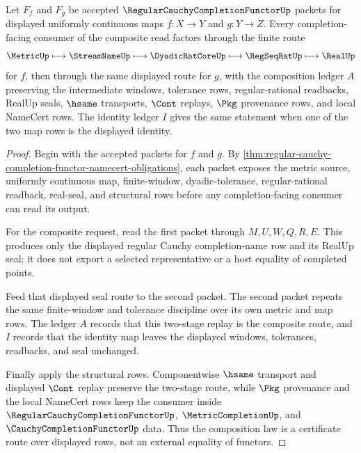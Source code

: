 \begin{theorem}
\label{thm:regular-cauchy-completion-functor-composition-law}
Let $F_f$ and $F_g$ be accepted $\RegularCauchyCompletionFunctorUp$ packets for displayed uniformly continuous maps $f \colon X \to Y$ and $g \colon Y \to Z$. Every completion-facing consumer of the composite read factors through the finite route
$$
\MetricUp \longmapsto \StreamNameUp \longmapsto \DyadicRatCoreUp \longmapsto \RegSeqRatUp \longmapsto \RealUp
$$
for $f$, then through the same displayed route for $g$, with the composition ledger $A$ preserving the intermediate windows, tolerance rows, regular-rational readbacks, RealUp seals, $\hsame$ transports, $\Cont$ replays, $\Pkg$ provenance rows, and local NameCert rows. The identity ledger $I$ gives the same statement when one of the two map rows is the displayed identity.
\end{theorem}
\begin{proof}
Begin with the accepted packets for $f$ and $g$. By \autoref{thm:regular-cauchy-completion-functor-namecert-obligations}, each packet exposes the metric source, uniformly continuous map, finite-window, dyadic-tolerance, regular-rational readback, real-seal, and structural rows before any completion-facing consumer can read its output.

For the composite request, read the first packet through $M,U,W,Q,R,E$. This produces only the displayed regular Cauchy completion-name row and its RealUp seal; it does not export a selected representative or a host equality of completed points.

Feed that displayed seal route to the second packet. The second packet repeats the same finite-window and tolerance discipline over its own metric and map rows. The ledger $A$ records that this two-stage replay is the composite route, and $I$ records that the identity map leaves the displayed windows, tolerances, readbacks, and seal unchanged.

Finally apply the structural rows. Componentwise $\hsame$ transport and displayed $\Cont$ replay preserve the two-stage route, while $\Pkg$ provenance and the local NameCert rows keep the consumer inside $\RegularCauchyCompletionFunctorUp$, $\MetricCompletionUp$, and $\CauchyCompletionFunctorUp$ data. Thus the composition law is a certificate route over displayed rows, not an external equality of functors.
\end{proof}

